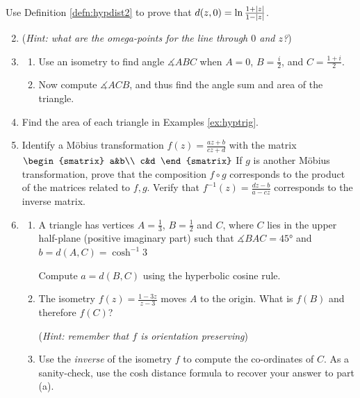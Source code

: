 \begin{exercises}
	\exstart Use Definition \ref{defn:hypdist2} to prove that $d(z,0)=\ln\frac{1+\left| z\right|}{1-\left| z\right|}$.\vspace{-5pt}
	\begin{enumerate}\setcounter{enumi}{1}
	  \item[](\emph{Hint: what are the omega-points for the line through $0$ and $z$?})
	  
	  
	  \item\begin{enumerate}
	    \item Use an isometry to find angle $\measuredangle ABC$ when $A=0$, $B=\frac i2$, and $C=\frac{1+i}2$.
	    \item Now compute $\measuredangle ACB$, and thus find the angle sum and area of the triangle.
	  \end{enumerate} 
	  
 		
 		\item Find the area of each triangle in Examples \ref{ex:hyptrig}.
	
	
	  \item Identify a Möbius transformation $f(z)=\frac{az+b}{cz+d}$ with the matrix
	  $\begin{smatrix}
	  	a&b\\
	  	c&d
	  \end{smatrix}$
	  If $g$ is another Möbius transformation, prove that the composition $f\circ g$ corresponds to the product of the matrices related to $f,g$. Verify that $f^{-1}(z)=\frac{dz-b}{a-cz}$ corresponds to the inverse matrix.\footnotemark{}
	  
	  
	  \item\begin{enumerate}
	    \item A triangle has vertices $A=\frac 13$, $B=\frac 12$ and $C$, where $C$ lies in the upper half-plane (positive imaginary part) such that $\measuredangle{BAC}=\ang{45}$ and $b=d(A,C)=\cosh^{-1}3$\par
	    Compute $a=d(B,C)$ using the hyperbolic cosine rule.
	    
	    \item The isometry $f(z)=\frac{1-3z}{z-3}$ moves $A$ to the origin. What is $f(B)$ and therefore $f(C)$?\par
	   	(\emph{Hint: remember that $f$ is orientation preserving})
	    
	    \item Use the \emph{inverse} of the isometry $f$ to compute the co-ordinates of $C$. As a sanity-check, use the cosh distance formula to recover your answer to part (a).    
	  \end{enumerate}
	  

\end{enumerate}
\end{exercises}

